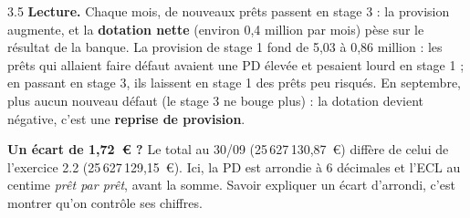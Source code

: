 \begin{correction}{3.5}
\textbf{Lecture.} Chaque mois, de nouveaux prêts passent en stage 3 : la provision augmente, et la
\textbf{dotation nette} (environ 0,4 million par mois) pèse sur le résultat de la banque. La provision
de stage 1 fond de 5,03 à 0,86 million : les prêts qui allaient faire défaut avaient une PD élevée et
pesaient lourd en stage 1 ; en passant en stage 3, ils laissent en stage 1 des prêts peu risqués. En
septembre, plus aucun nouveau défaut (le stage 3 ne bouge plus) : la dotation devient négative, c'est
une \textbf{reprise de provision}.

\textbf{Un écart de 1,72~€ ?} Le total au 30/09 (25\,627\,130,87~€) diffère de celui de l'exercice 2.2
(25\,627\,129,15~€). Ici, la PD est arrondie à 6 décimales et l'ECL au centime \emph{prêt par prêt},
avant la somme. Savoir expliquer un écart d'arrondi, c'est montrer qu'on contrôle ses chiffres.
\end{correction}

